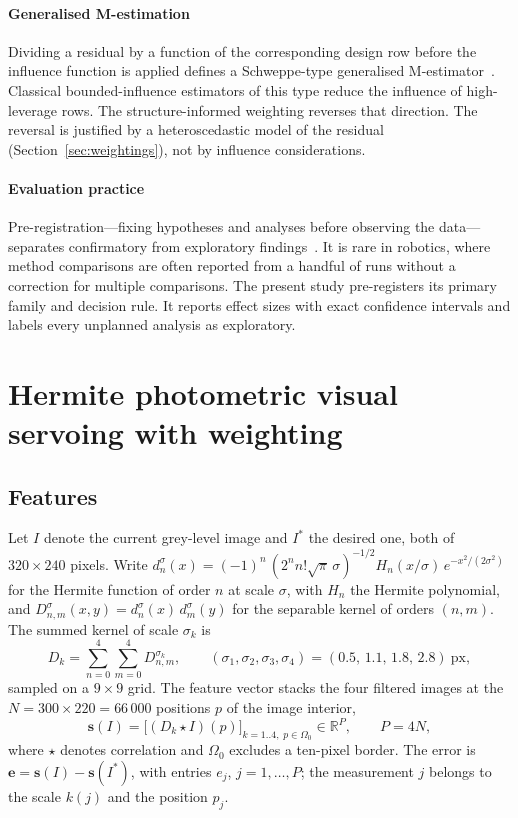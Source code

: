 \documentclass[preprint,12pt]{elsarticle}
\theoremstyle{remark}
\newcommand{\e}{\mathbf{e}}
\newcommand{\s}{\mathbf{s}}
\begin{document}
\paragraph{Generalised M-estimation}
Dividing a residual by a function of the corresponding design row before the
influence function is applied defines a Schweppe-type generalised
M-estimator~\cite{handschin1975bad,hampel1986robust,maronna2019robust}. Classical
bounded-influence estimators of this type reduce the influence of high-leverage
rows. The structure-informed weighting reverses that direction. The reversal is
justified by a heteroscedastic model of the residual
(Section~\ref{sec:weightings}), not by influence considerations.

\paragraph{Evaluation practice}
Pre-registration---fixing hypotheses and analyses before observing the
data---separates confirmatory from exploratory findings~\cite{nosek2018prereg}.
It is rare in robotics, where method comparisons are often reported from a
handful of runs without a correction for multiple comparisons. The present
study pre-registers its primary family and decision rule. It reports
effect sizes with exact confidence intervals and labels every unplanned
analysis as exploratory.

\section{Hermite photometric visual servoing with weighting}
\label{sec:setting}

\subsection{Features}
Let $I$ denote the current grey-level image and $I^{*}$ the desired one,
both of $320\times240$ pixels. Write
$d^{\sigma}_{n}(x)=(-1)^{n}\,(2^{n}n!\sqrt{\pi}\,\sigma)^{-1/2}H_{n}(x/\sigma)\,e^{-x^{2}/(2\sigma^{2})}$
for the Hermite function of order $n$ at scale $\sigma$, with $H_{n}$ the
Hermite polynomial, and $D^{\sigma}_{n,m}(x,y)=d^{\sigma}_{n}(x)\,d^{\sigma}_{m}(y)$
for the separable kernel of orders $(n,m)$. The summed kernel of scale
$\sigma_{k}$ is
\begin{equation}
D_{k}=\sum_{n=0}^{4}\sum_{m=0}^{4}D^{\sigma_{k}}_{n,m},\qquad
(\sigma_{1},\sigma_{2},\sigma_{3},\sigma_{4})=(0.5,\,1.1,\,1.8,\,2.8)\ \text{px},
\label{eq:summed-kernel}
\end{equation}
sampled on a $9\times9$ grid. The feature vector stacks the four filtered
images at the $N=300\times220=66\,000$ positions $p$ of the image interior,
\begin{equation}
\s(I)=\bigl[(D_{k}\star I)(p)\bigr]_{k=1..4,\;p\in\Omega_{0}}\in\mathbb{R}^{P},\qquad P=4N,
\label{eq:features}
\end{equation}
where $\star$ denotes correlation and $\Omega_{0}$ excludes a ten-pixel border.
The error is $\e=\s(I)-\s(I^{*})$, with entries $e_{j}$, $j=1,\dots,P$; the
measurement $j$ belongs to the scale $k(j)$ and the position $p_{j}$.
\end{document}

